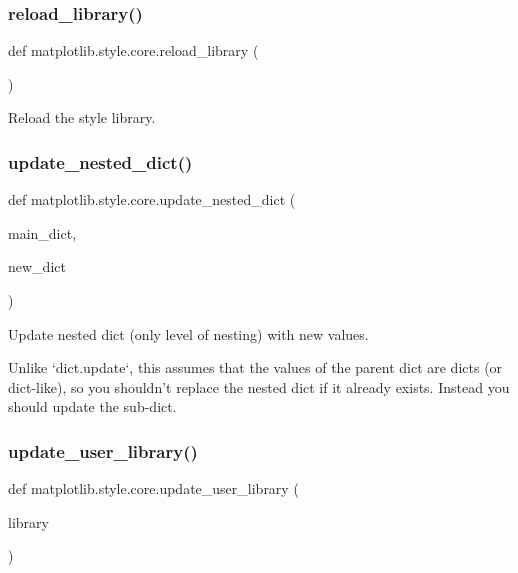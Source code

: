 \subsubsection{\texorpdfstring{reload\+\_\+library()}{reload\_library()}}
{\footnotesize\ttfamily def matplotlib.\+style.\+core.\+reload\+\_\+library (\begin{DoxyParamCaption}{ }\end{DoxyParamCaption})}

\begin{DoxyVerb}Reload the style library.\end{DoxyVerb}
 \mbox{\label{namespacematplotlib_1_1style_1_1core_a47cf38d3c8ec7e1391e20e2d1efa8712}} 
\subsubsection{\texorpdfstring{update\+\_\+nested\+\_\+dict()}{update\_nested\_dict()}}
{\footnotesize\ttfamily def matplotlib.\+style.\+core.\+update\+\_\+nested\+\_\+dict (\begin{DoxyParamCaption}\item[{}]{main\+\_\+dict,  }\item[{}]{new\+\_\+dict }\end{DoxyParamCaption})}

\begin{DoxyVerb}Update nested dict (only level of nesting) with new values.

Unlike `dict.update`, this assumes that the values of the parent dict are
dicts (or dict-like), so you shouldn't replace the nested dict if it
already exists. Instead you should update the sub-dict.
\end{DoxyVerb}
 \mbox{\label{namespacematplotlib_1_1style_1_1core_af10e002f693151e340af7409c99f05b5}} 
\subsubsection{\texorpdfstring{update\+\_\+user\+\_\+library()}{update\_user\_library()}}
{\footnotesize\ttfamily def matplotlib.\+style.\+core.\+update\+\_\+user\+\_\+library (\begin{DoxyParamCaption}\item[{}]{library }\end{DoxyParamCaption})}

